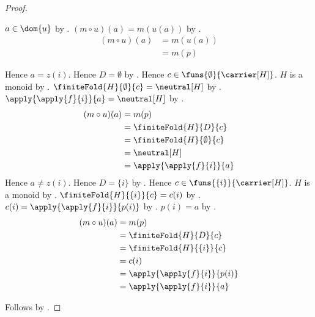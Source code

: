\begin{proof}
\begin{subproof}
        $a\in\dom{u}$ by .
        $(m\circ u)(a)=m(u(a))$ by .
        \begin{align*}
            (m\circ u)(a)
                &= m(u(a))
                \\
                &= m(p)
        \end{align*}
        \begin{byCase}
            Hence $a=z(i)$.
            Hence $D=\emptyset$ by
                .
            Hence $c\in\funs{\emptyset}{\carrier[H]}$.
            $H$ is a monoid by
                .
            $\finiteFold{H}{\emptyset}{c}=\neutral[H]$ by
                .
            $\apply{\apply{f}{i}}{a}=\neutral[H]$ by
                .
            \begin{align*}
                (m\circ u)(a)
                    &= m(p)
                    \\
                    &= \finiteFold{H}{D}{c}
                    \\
                    &= \finiteFold{H}{\emptyset}{c}
                    \\
                    &= \neutral[H]
                    \\
                    &= \apply{\apply{f}{i}}{a}
            \end{align*}
            Hence $a\neq z(i)$.
            Hence $D=\{i\}$ by
                .
            Hence $c\in\funs{\{i\}}{\carrier[H]}$.
            $H$ is a monoid by
                .
            $\finiteFold{H}{\{i\}}{c}=c(i)$ by
                .
            $c(i)=\apply{\apply{f}{i}}{p(i)}$ by
                .
            $p(i)=a$ by
                .
            \begin{align*}
                (m\circ u)(a)
                    &= m(p)
                    \\
                    &= \finiteFold{H}{D}{c}
                    \\
                    &= \finiteFold{H}{\{i\}}{c}
                    \\
                    &= c(i)
                    \\
                    &= \apply{\apply{f}{i}}{p(i)}
                    \\
                    &= \apply{\apply{f}{i}}{a}
            \end{align*}
        \end{byCase}
    \end{subproof}
    Follows by .
\end{proof}


